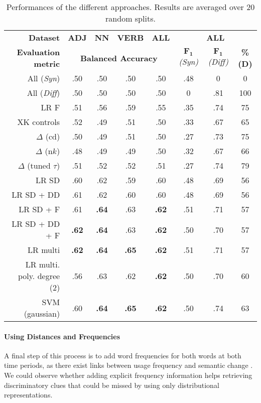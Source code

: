\documentclass[11pt]{article}
\begin{document}
\begin{table*}[ht]
    \centering
    \begin{tabular}{r|cccc|ccc}\toprule
         \textbf{Dataset} & \textbf{ADJ} & \textbf{NN} & \textbf{VERB} & \textbf{ALL} & \multicolumn{3}{c}{\textbf{ALL}}  \\
         \textbf{Evaluation metric} & \multicolumn{4}{c|}{\textbf{Balanced Accuracy}} & $\mathbf{F_1}$\textit{(Syn)} & $\mathbf{F_1}$\textit{(Diff)} & \textbf{\%(D)}  \\
         \cmidrule{1-8}
        All (\textit{Syn}) & .50 & .50 & .50 & .50  & .48 & 0 & 0 \\
        All (\textit{Diff}) & .50 & .50 & .50 & .50  & 0 & .81 & 100 \\
        LR F & .51 & .56 & .59 & .55  & .35 & .74 & 75 \\
        \cmidrule{1-8}
        XK controls & .52 & .49 & .51 & .50 & .33 & .67 & 65\\
        $\Delta$ (cd) & .50 & .49 & .51 & .50 & .27 & .73 & 75\\
        $\Delta$ (n$k$) & .48 & .49 & .49 & .50 & .32 & .67 & 66\\
        \cmidrule{1-8}
        $\Delta$ (tuned $\tau$) & .51 & .52 & .52 & .51 & .27 & .74 & 79\\
        LR SD & .60 & .62 & .59 & .60 & .48 & .69 & 56\\
        LR SD + DD & .61 & .62 & .60 & .60  & .48 & .69 & 56 \\
        LR SD + F & .61 & \textbf{.64} & .63 & \textbf{.62}  & .51 & .71 & 57\\
        LR SD + DD + F & \textbf{.62} & \textbf{.64} & .63 & \textbf{.62}  & .50 & .70 & 57\\
        LR multi & \textbf{.62} & \textbf{.64} & \textbf{.65} & \textbf{.62}  & .51 & .71 & 57\\
        \cmidrule{1-8}
        LR multi. poly. degree (2) & .56 & .63 & .62 & \textbf{.62}  & .50 & .70 & 60\\
        SVM (gaussian) & .60 & \textbf{.64} & \textbf{.65} & \textbf{.62} & .50 & .74 & 63\\
        \bottomrule
    \end{tabular}
    \caption{Performances of the different approaches.  Results are averaged over 20 random splits.}
    \label{tab:results}
\end{table*}


\paragraph{Using Distances and Frequencies}
A final step of this process is to add word frequencies for both words at both time periods, as there exist links between usage frequency and semantic change \citet{zipf-1945-repetition}. We could observe whether adding explicit frequency information helps retrieving discriminatory clues that could be missed by using only distributional representations.
\end{document}
